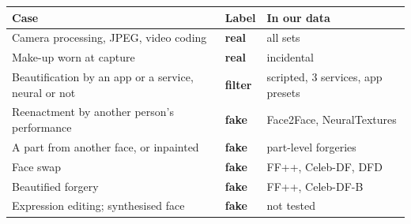 \documentclass[border=4pt]{standalone}
\begin{document}
\Large
\begin{tabular}{>{\raggedright\arraybackslash}p{8.6cm}l>{\raggedright\arraybackslash}p{5.6cm}}
\toprule
Case & Label & In our data \\
\midrule
Camera processing, JPEG, video coding & \textcolor{cr}{\textbf{real}} & all sets \\[3pt]
Make-up worn at capture & \textcolor{cr}{\textbf{real}} & incidental \\[3pt]
Beautification by an app or a service, neural or not & \textcolor{cl}{\textbf{filter}} & scripted, 3 services, app presets \\[3pt]
Reenactment by another person's performance & \textcolor{cf}{\textbf{fake}} & Face2Face, NeuralTextures \\[3pt]
A part from another face, or inpainted & \textcolor{cf}{\textbf{fake}} & part-level forgeries \\[3pt]
Face swap & \textcolor{cf}{\textbf{fake}} & FF++, Celeb-DF, DFD \\[3pt]
Beautified forgery & \textcolor{cf}{\textbf{fake}} & FF++, Celeb-DF-B \\[3pt]
Expression editing; synthesised face & \textcolor{cf}{\textbf{fake}} & \cellcolor{fail}not tested \\
\bottomrule
\end{tabular}
\end{document}
